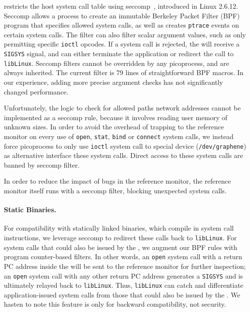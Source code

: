 \graphene{} restricts the host system call table 
using seccomp~\cite{seccomp}, introduced in Linux 2.6.12.
Seccomp allows a process to create an immutable Berkeley Packet Filter (BPF) program
that specifies allowed system calls, as well as creates {\tt ptrace} 
events on certain system calls.
The filter can also filter scalar argument values,
such as only permitting specific {\tt ioctl} opcodes.
If a system call is rejected, the \pal{} will receive a {\tt SIGSYS} signal,
and can either terminate the application or redirect the 
call to {\tt libLinux}.
Seccomp filters cannot be overridden by any picoprocess,
and are always inherited.
The current \graphene{} filter is 79 lines 
of straightforward BPF macros.  In our experience, adding more precise argument checks
has not significantly changed performance.


Unfortunately, the logic to check for allowed paths network addresses cannot be implemented 
as a seccomp rule, because it involves reading user memory of unknown sizes. 
In order to avoid the overhead of trapping to the reference monitor on 
every use of {\tt open}, {\tt stat}, {\tt bind} or {\tt connect} system calls, we instead 
force picoprocess to only use {\tt ioctl} system call to \graphene{} special device ({\tt /dev/graphene}) as alternative interface these system calls. Direct access to these system calls are banned by seccomp filter.

In order to reduce the impact of bugs in the reference monitor,
the reference monitor itself runs with a seccomp filter,
blocking unexpected system calls.

\paragraph{Static Binaries.} 
For compatibility with statically linked binaries, which 
compile in system call instructions,
we leverage seccomp to redirect these calls 
back to {\tt libLinux}.  
For system calls that could also be issued by the \pal{},
we augment our BPF rules with program counter-based filters.
In other words, an {\tt open} system call with a return PC address inside the \pal{} 
will be sent to the reference monitor for further inspection;
an {\tt open} system call with any other return PC address generates 
a {\tt SIGSYS} and is ultimately relayed back to {\tt libLinux}.
Thus, {\tt libLinux} can catch and differentiate application-issued system calls
from those that could also be issued by the \pal{}.
We hasten to note this feature is only for backward compatibility,
not security. 


